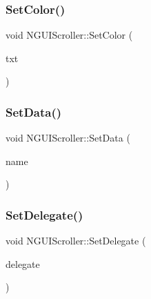 \hypertarget{class_n_g_u_i_scroller_afe567ab5f67defdb11e2fbdbb6708989}{}\label{class_n_g_u_i_scroller_afe567ab5f67defdb11e2fbdbb6708989} 
\subsubsection{\texorpdfstring{Set\+Color()}{SetColor()}\hspace{0.1cm}{\footnotesize\ttfamily [2/2]}}
{\footnotesize\ttfamily void N\+G\+U\+I\+Scroller\+::\+Set\+Color (\begin{DoxyParamCaption}\item[{string \&in}]{txt }\end{DoxyParamCaption})}

\hypertarget{class_n_g_u_i_scroller_afdcf1faf70bdb6dc2b18543232e8385b}{}\label{class_n_g_u_i_scroller_afdcf1faf70bdb6dc2b18543232e8385b} 
\subsubsection{\texorpdfstring{Set\+Data()}{SetData()}}
{\footnotesize\ttfamily void N\+G\+U\+I\+Scroller\+::\+Set\+Data (\begin{DoxyParamCaption}\item[{string \&in}]{name }\end{DoxyParamCaption})}

\hypertarget{class_n_g_u_i_scroller_a88be7ec84e4ca5c5b5b19057ba9dc145}{}\label{class_n_g_u_i_scroller_a88be7ec84e4ca5c5b5b19057ba9dc145} 
\subsubsection{\texorpdfstring{Set\+Delegate()}{SetDelegate()}}
{\footnotesize\ttfamily void N\+G\+U\+I\+Scroller\+::\+Set\+Delegate (\begin{DoxyParamCaption}\item[{N\+G\+U\+I\+Scroller\+Delegate@}]{delegate }\end{DoxyParamCaption})}

\hypertarget{class_n_g_u_i_scroller_a3b2aec59be736990e7985b78cccb8c20}{}\label{class_n_g_u_i_scroller_a3b2aec59be736990e7985b78cccb8c20} 
